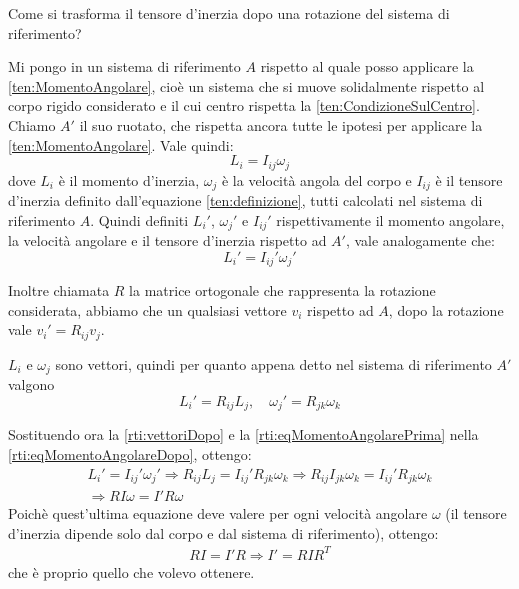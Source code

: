 \documentclass[../main.tex]{subfiles}
\begin{document}
\label{ex:rti}

\textex
Come si trasforma il tensore d'inerzia dopo una rotazione del sistema di riferimento?

\solution
Mi pongo in un sistema di riferimento $A$ rispetto al quale posso applicare la \cref{ten:MomentoAngolare}, cioè un sistema che si muove solidalmente rispetto al corpo rigido considerato e il cui centro rispetta la \cref{ten:CondizioneSulCentro}. Chiamo $A'$ il suo ruotato, che rispetta ancora tutte le ipotesi per applicare la \cref{ten:MomentoAngolare}. Vale quindi:
\begin{equation} \label{rti:eqMomentoAngolarePrima}
	L_i=I_{ij}\omega_j
\end{equation}
dove $L_i$ è il momento d'inerzia, $\omega_j$ è la velocità angola del corpo e $I_{ij}$ è il tensore d'inerzia definito dall'equazione \cref{ten:definizione}, tutti calcolati nel sistema di riferimento $A$. Quindi definiti $L_i'$, $\omega_j'$ e $I_{ij}'$ rispettivamente il momento angolare, la velocità angolare e il tensore d'inerzia rispetto ad $A'$, vale analogamente che:
\begin{equation}\label{rti:eqMomentoAngolareDopo}
	L_i'=I_{ij}'\omega_j'
\end{equation}

Inoltre chiamata $R$ la matrice ortogonale che rappresenta la rotazione considerata, abbiamo che un qualsiasi vettore $v_i$ rispetto ad $A$, dopo la rotazione vale $v_i'=R_{ij}v_j$.

$L_i$ e $\omega_j$ sono vettori, quindi per quanto appena detto nel sistema di riferimento $A'$ valgono
\begin{equation}\label{rti:vettoriDopo}
	L_i'=R_{ij}L_j, \quad \omega_j'=R_{jk}\omega_k
\end{equation}

Sostituendo ora la \cref{rti:vettoriDopo} e la \cref{rti:eqMomentoAngolarePrima} nella \cref{rti:eqMomentoAngolareDopo}, ottengo:
\begin{gather*}
	L_i'=I_{ij}'\omega_j' \Longrightarrow R_{ij}L_j=I_{ij}'R_{jk}\omega_k \Longrightarrow R_{ij}I_{jk}\omega_k=I_{ij}'R_{jk}\omega_k \\
	\Longrightarrow RI\omega=I'R\omega
\end{gather*}
Poichè quest'ultima equazione deve valere per ogni velocità angolare $\omega$ (il tensore d'inerzia dipende solo dal corpo e dal sistema di riferimento), ottengo:
\begin{gather*}
	RI=I'R \Longrightarrow I'=RIR^{T}
\end{gather*}
che è proprio quello che volevo ottenere.
\end{document}
